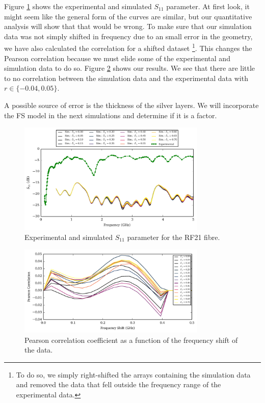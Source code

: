 Figure \ref{fig:antenna.sParameters} shows the experimental and simulated
$S_{11}$ parameter. At first look, it might seem like the general form 
of the curves are similar, but our quantitative analysis will show 
that that would be wrong. To make sure that our simulation data was not simply
shifted in frequency due to an small error in the geometry, we have
also calculated the correlation for a shifted dataset 
\footnote{To do so, we simply right-shifted the arrays containing
the simulation data and removed the data that fell outside the frequency range 
of the experimental data.}. This changes
the Pearson correlation because we must elide some of the experimental
and simulation data to do so. Figure \ref{fig:antenna.shiftCorrelation}
shows our results. We see that there are little to no correlation
between the simulation data and the experimental data with $r\in\{-0.04,0.05\}$. 

A possible source of error is the thickness of the silver layers. We will incorporate
the FS model in the next simulations and determine if it is
a factor. 

\begin{figure}
 \centering
 \includegraphics[width=0.8\textwidth]{figs/active/sParameters-concSweepS11.pdf}
 \caption[Experimental and simulated $S_{11}$ parameter for the RF21 fibre]
	 {Experimental and simulated $S_{11}$ parameter for the RF21 fibre.}
 \label{fig:antenna.sParameters}
\end{figure}

\begin{figure}
 \centering
 \includegraphics[width=0.8\textwidth]{figs/active/shiftCorrelationS11.pdf}
 \caption{Pearson correlation coefficient as a function of the frequency
	  shift of the data.}
 \label{fig:antenna.shiftCorrelation}
\end{figure}

